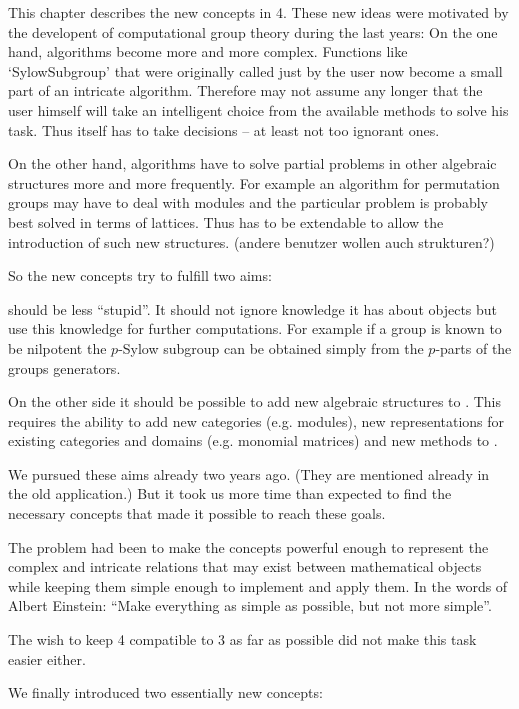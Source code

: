 
This chapter describes the new concepts in {\GAP}4.
These new ideas were
motivated by the developent of computational group theory during the last
years:
On the one hand, algorithms become more and more complex. Functions like
`SylowSubgroup' that were originally called just by the user now become
a small part of an intricate algorithm. Therefore {\GAP} may not assume any
longer that the user himself will take an intelligent choice from the
available methods to solve his task. Thus {\GAP} itself has to take decisions
-- at least not too ignorant ones.

On the other hand, algorithms have to solve partial problems in other
algebraic structures more and more frequently. For example an algorithm for
permutation groups may have to deal with modules and the particular problem
is probably best solved in terms of lattices. Thus {\GAP} has to be extendable
to allow the introduction of such new structures.
(andere benutzer wollen auch strukturen?)

So the new concepts try to fulfill two aims:

{\GAP} should be less ``stupid''. It should not ignore knowledge it has about
objects but use this knowledge for further computations. For example if a
group is known to be nilpotent the $p$-Sylow subgroup can be obtained simply
from the $p$-parts of the groups generators.

On the other side it should be possible to add new algebraic structures to
{\GAP}. This requires the ability to add new categories (e.g. modules), new
representations for existing categories and domains (e.g. monomial matrices)
and new methods to {\GAP}.

We pursued these aims already two years ago. (They are mentioned already in
the old application.) But it took us more time than expected to find the
necessary concepts that made it possible to reach these goals.

The problem had been to make the concepts powerful enough to represent the
complex and intricate relations that may exist between mathematical objects
while keeping them simple enough to implement and apply them. In the words
of Albert Einstein: ``Make everything as simple as possible, but not more
simple''.

The wish to keep {\GAP} 4 compatible to {\GAP} 3 as far as possible did not make
this task easier either.

We finally introduced two essentially new concepts:

